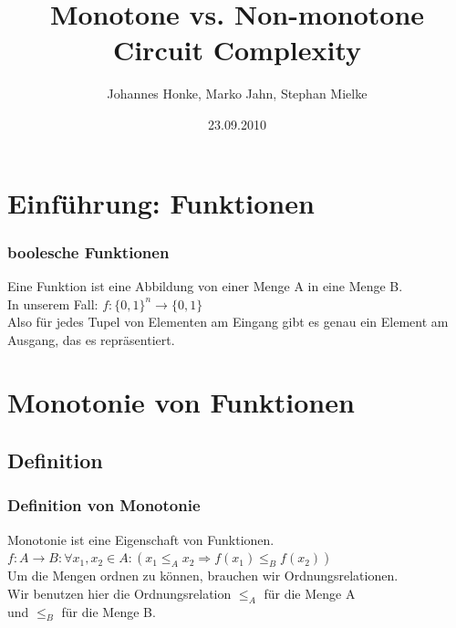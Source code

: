 \documentclass[hyperref={pdfpagelabels=false}]{beamer} %
\title{Monotone vs. Non-monotone Circuit Complexity}
\author{Johannes Honke, Marko Jahn, Stephan Mielke}
\institute{BTU-Cottbus}
\date{23.09.2010}
\begin{document}
\begin{frame}[plain]
 \titlepage
 \tableofcontents
\end{frame}

\section{Einführung: Funktionen}
\begin{frame} %
 \frametitle{boolesche Funktionen}
Eine Funktion ist eine Abbildung von einer Menge A in eine Menge B.\\
In unserem Fall:
$f: \{0,1\}^{n} \rightarrow \{0,1\}$ \\
Also für jedes Tupel von Elementen am Eingang gibt es genau ein Element am Ausgang, das es repräsentiert.
\end{frame}

\section{Monotonie von Funktionen}
\subsection*{Definition}
\begin{frame}%
 \frametitle{Definition von Monotonie}
Monotonie ist eine Eigenschaft von Funktionen.\\
$f:A \rightarrow B: \forall x_1,x_2 \in A : (x_1 \leq_A x_2 \Rightarrow f(x_1) \leq_B f(x_2))$\\
Um die Mengen ordnen zu können, brauchen wir Ordnungsrelationen.\\
Wir benutzen hier die Ordnungsrelation $\leq_A$ für die Menge A\\
und $\leq_B$ für die Menge B.\\
\end{frame}
\end{document}
